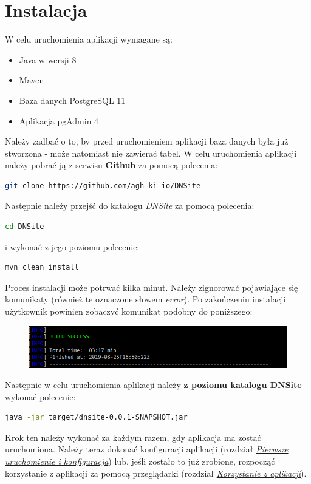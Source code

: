 \documentclass[12pt] {article}
\begin{document}
\section{Instalacja}
W celu uruchomienia aplikacji wymagane są:
\begin{itemize}
\item Java w wersji 8
\item Maven
\item Baza danych PostgreSQL 11
\item Aplikacja pgAdmin 4
\end{itemize}
Należy zadbać o to, by przed uruchomieniem aplikacji baza danych była już stworzona - może natomiast nie zawierać tabel.
W celu uruchomienia aplikacji należy pobrać ją z serwisu \textbf{Github} za pomocą polecenia:
\begin{lstlisting}[language=bash]
git clone https://github.com/agh-ki-io/DNSite
\end{lstlisting}
Następnie należy przejść do katalogu \emph{DNSite} za pomocą polecenia:
\begin{lstlisting}[language=bash]
cd DNSite
\end{lstlisting}
i wykonać z jego poziomu polecenie:
\begin{lstlisting}[language=bash]
mvn clean install
\end{lstlisting}
Proces instalacji może potrwać kilka minut. Należy zignorować pojawiające się komunikaty (również te oznaczone słowem \emph{error}). Po zakończeniu instalacji użytkownik powinien zobaczyć komunikat podobny do poniższego:
\begin{figure}[H]
\centering
\includegraphics[width=\textwidth]{res/1_budowanie}
\end{figure}
Następnie w celu uruchomienia aplikacji należy \textbf{z poziomu katalogu DNSite} wykonać polecenie:
\begin{lstlisting}[language=bash]
java -jar target/dnsite-0.0.1-SNAPSHOT.jar
\end{lstlisting}
Krok ten należy wykonać za każdym razem, gdy aplikacja ma zostać uruchomiona. Należy teraz dokonać konfiguracji aplikacji (rozdział \hyperref[first_run]{\emph{Pierwsze uruchomienie i konfiguracja}}) lub, jeśli zostało to już zrobione, rozpocząć korzystanie z aplikacji za pomocą przeglądarki (rozdział \hyperref[webapp]{\emph{Korzystanie z aplikacji}}).
\end{document}
